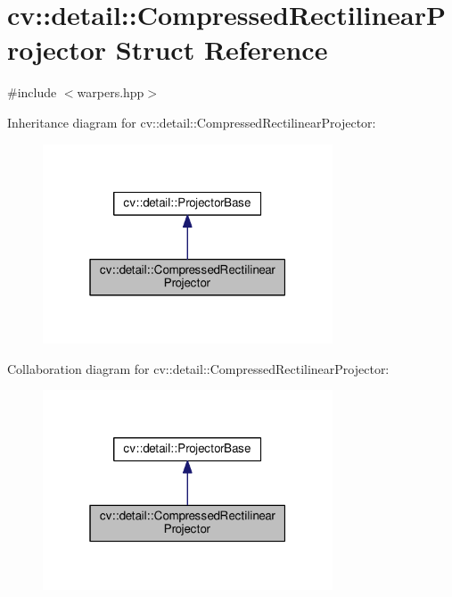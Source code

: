 \hypertarget{structcv_1_1detail_1_1CompressedRectilinearProjector}{\section{cv\-:\-:detail\-:\-:Compressed\-Rectilinear\-Projector Struct Reference}
\label{structcv_1_1detail_1_1CompressedRectilinearProjector}
}


{\ttfamily \#include $<$warpers.\-hpp$>$}



Inheritance diagram for cv\-:\-:detail\-:\-:Compressed\-Rectilinear\-Projector\-:\nopagebreak
\begin{figure}[H]
\begin{center}
\leavevmode
\includegraphics[width=244pt]{structcv_1_1detail_1_1CompressedRectilinearProjector__inherit__graph}
\end{center}
\end{figure}


Collaboration diagram for cv\-:\-:detail\-:\-:Compressed\-Rectilinear\-Projector\-:\nopagebreak
\begin{figure}[H]
\begin{center}
\leavevmode
\includegraphics[width=244pt]{structcv_1_1detail_1_1CompressedRectilinearProjector__coll__graph}
\end{center}
\end{figure}
